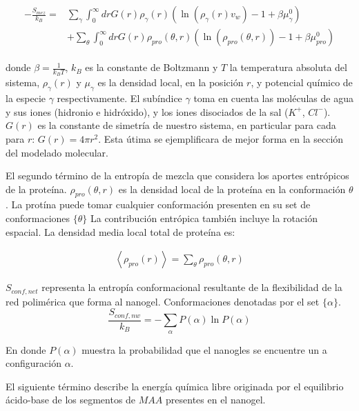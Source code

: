 \begin{align}
	\begin{aligned}
		-\frac{S_{mez}}{k_B}= &\sum_{\gamma}\int_0^\infty{dr G(r)\rho_\gamma(r)\left(\ln \left(\rho_\gamma (r)v_w\right) -1 + \beta\mu^0_\gamma\right)} \\
		&+ \sum_{\theta}\int_0^\infty{dr G(r)\rho_{pro}(\theta,r)\left(\ln \left(\rho_{pro}(\theta,r)\right) -1 + \beta\mu^0_{pro} \right)}
	\end{aligned}
\end{align}



\noindent donde $\beta = \frac{1}{k_BT}$, $k_B$ es la constante de Boltzmann y $T$ la temperatura absoluta del sistema, $\rho_\gamma(r)$ y $\mu_\gamma$ es la densidad local, en la posici\'on $r$, y potencial qu\'imico de la especie $\gamma$ respectivamente.
El sub\'indice $\gamma$ toma en cuenta las mol\'eculas de agua y sus iones (hidronio e hidr\'oxido), y los iones disociados de la sal ($K^+$, $Cl^-$). $G(r)$ es la constante de simetr\'ia de nuestro sistema, en particular para cada para $r$: $G(r) =4\pi r^2$. Esta \'utima se ejemplificara de mejor forma en la secci\'on del modelado molecular.

El segundo t\'ermino de la entrop\'ia de mezcla que considera los aportes entr\'opicos de la prote\'ina.
$\rho_{pro}(\theta,r)$ es la densidad local de la prote\'ina en la conformaci\'on  $\theta$.  La prot\'ina puede tomar cualquier conformaci\'on presenten en su set de conformaciones $\{\theta \}$
La contribuci\'on entr\'opica tambi\'en incluye la rotación espacial.
La densidad media local total de prote\'ina es: 


\begin{align}
	\left<\rho_{pro}(r)\right> = \sum_\theta{\rho_{pro}(\theta,r)}
\end{align}

$S_{conf,net}$ representa la entrop\'ia conformacional resultante de la flexibilidad de la red polim\'erica que forma al nanogel. Conformaciones denotadas por el set $\{\alpha\}$. 
\begin{equation}
	\frac{S_{conf,nw}}{k_B} = - \sum_{\alpha}{P(\alpha)\ln P(\alpha)}
\end{equation}

\noindent En donde $P(\alpha)$ muestra la probabilidad que el nanogles se encuentre un a configuraci\'on $\alpha$.

El siguiente t\'ermino describe la energ\'ia qu\'imica libre originada por el equilibrio \'acido-base de los segmentos de $MAA$ presentes en el nanogel.

